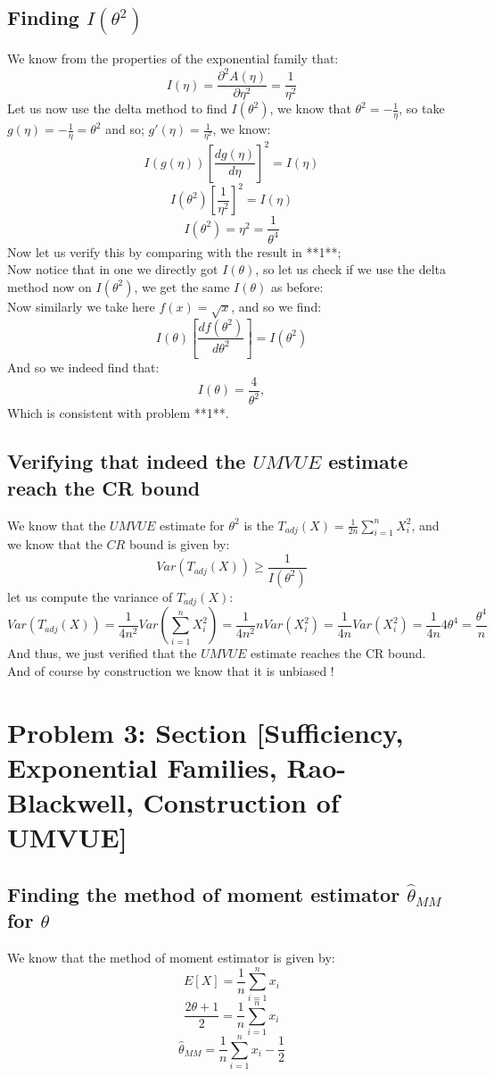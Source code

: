 \documentclass[12pt]{article}
\begin{document}
\subsection*{Finding $I(\theta^2)$}
We know from the properties of the exponential family that:
\[
I(\eta) = \frac{\partial ^2A(\eta)}{\partial \eta^2} = \frac{1}{\eta^2}
\]
Let us now use the delta method to find $I(\theta^2)$, we know that $\theta^2 = -\frac{1}{\eta}$, so take $g(\eta) = -\frac{1}{\eta} = \theta^2$ and so; $g'(\eta) = \frac{1}{\eta^2}$, we know: 
\[
I(g(\eta))[\frac{dg(\eta)}{d\eta}]^2 = I(\eta)
\]
\[
I(\theta^2)[\frac{1}{\eta^2}]^2 = I(\eta)
\]
\[
I(\theta^2) = \eta^2 = \frac{1}{\theta^4}
\]
Now let us verify this by comparing with the result in **1**; \\ 
Now notice that in one we directly got $I(\theta)$, so let us check if we use the delta method now on $I(\theta^2)$, we get the same $I(\theta)$ as before: \\
Now similarly we take here $f(x) = \sqrt{x}$, and so we find: 
\[
I(\theta) [\frac{df(\theta^2)}{d\theta^2}] = I(\theta^2)
\]
And so we indeed find that: 
\[
I(\theta) = \frac{4}{\theta^2}, 
\]
Which is consistent with problem **1**. \\ 
\subsection*{Verifying that indeed the $UMVUE$ estimate reach the CR bound}
We know that the $UMVUE$ estimate for $\theta^2$ is the $T_{adj}(X) = \frac{1}{2n}\sum_{i=1}^{n}X_i^2$, and we know that the $CR$ bound is given by:
\[
Var(T_{adj}(X)) \geq \frac{1}{I(\theta^2)}
\]
let us compute the variance of $T_{adj}(X)$:
\[
Var(T_{adj}(X)) = \frac{1}{4n^2}Var(\sum_{i=1}^{n}X_i^2) = \frac{1}{4n^2}nVar(X_i^2) = \frac{1}{4n}Var(X_i^2) = \frac{1}{4n}4\theta^4 = \frac{\theta^4}{n}
\]
And thus, we just verified that the $UMVUE$ estimate reaches the CR bound. \\ 
And of course by construction we know that it is unbiased !
\section*{Problem 3: Section [Sufficiency, Exponential Families, Rao-Blackwell, Construction of UMVUE]}
\subsection*{Finding the method of moment estimator $\hat{\theta}_{MM}$ for $\theta$}
We know that the method of moment estimator is given by:
\[
E[X] = \frac{1}{n}\sum_{i=1}^{n}x_i
\] 
\[
\frac{2\theta +1}{2} = \frac{1}{n} \sum_{i=1}^{n}x_i
\]
\[
\hat{\theta}_{MM} = \frac{1}{n}\sum_{i=1}^{n}x_i - \frac{1}{2}
\]
\end{document}
